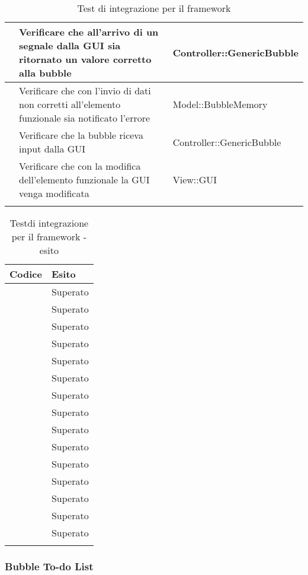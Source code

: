 \begin{longtable}{|c|P{7cm}|P{5cm}|}
	\hline {} & Verificare che all'arrivo di un segnale dalla GUI sia ritornato un valore corretto alla bubble & Controller::GenericBubble\\
	\hline {} & Verificare che con l'invio di dati non corretti all'elemento funzionale sia notificato l'errore & Model::BubbleMemory\\
	\hline {} & Verificare che la bubble riceva input dalla GUI & Controller::GenericBubble\\
	\hline {} & Verificare che con la modifica dell'elemento funzionale la GUI venga modificata & View::GUI\\
	\hline
	\caption{Test di integrazione per il framework}
\end{longtable}

\begin{longtable}{|c|c|}
	\hline \multicolumn{1}{|l|}{\textbf{Codice}} & \multicolumn{1}{l|}{\textbf{Esito}}
	\\
	\hline \testt{} & Superato\\
	\hline \testt{} & Superato\\
	\hline \testt{} & Superato\\
	\hline \testt{} & Superato\\
	\hline \testt{} & Superato\\
	\hline \testt{} & Superato\\
	\hline \testt{} & Superato\\
	\hline \testt{} & Superato\\
	\hline \testt{} & Superato\\
	\hline \testt{} & Superato\\
	\hline \testt{} & Superato\\
	\hline \testt{} & Superato\\
	\hline \testt{} & Superato\\
	\hline \testt{} & Superato\\
	\hline \testt{} & Superato\\
	\hline
	\caption{Testdi integrazione per il framework - esito}
\end{longtable}

\subsubsection{Bubble To-do List}

